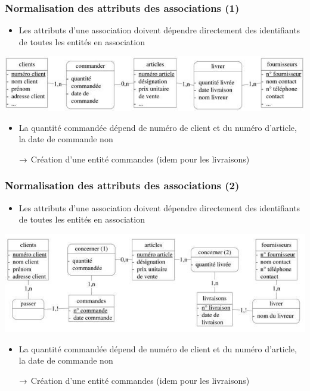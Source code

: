 \begin{frame}
  \frametitle{Normalisation des attributs des associations (1)}
  \begin{itemize}
    \item Les attributs d'une association doivent dépendre directement des identifiants de toutes les entités
      en association
  \end{itemize}
  \begin{center}
    \includegraphics[width=0.9\linewidth]{cardinalites.jpg}
  \end{center}
  \begin{itemize}
    \item La quantité commandée dépend de numéro de client et du numéro d'article, la date de commande non
    \item[$\rightarrow$] Création d'une entité commandes (idem pour les livraisons)
  \end{itemize}
\end{frame}

\begin{frame}
  \frametitle{Normalisation des attributs des associations (2)}
  \begin{itemize}
    \item Les attributs d'une association doivent dépendre directement des identifiants de toutes les entités
      en association
  \end{itemize}
  \begin{center}
    \includegraphics[width=0.9\linewidth]{normalisation_attributs_associations.jpg}
  \end{center}
  \begin{itemize}
    \item La quantité commandée dépend de numéro de client et du numéro d'article, la date de commande non
    \item[$\rightarrow$] Création d'une entité commandes (idem pour les livraisons)
  \end{itemize}
\end{frame}

